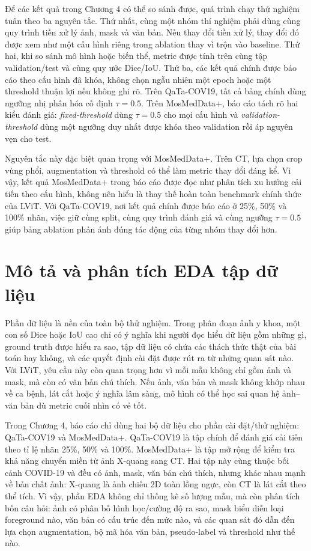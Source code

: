 Để các kết quả trong Chương 4 có thể so sánh được, quá trình chạy thử nghiệm tuân theo ba nguyên tắc. Thứ nhất, cùng một nhóm thí nghiệm phải dùng cùng quy trình tiền xử lý ảnh, mask và văn bản. Nếu thay đổi tiền xử lý, thay đổi đó được xem như một cấu hình riêng trong ablation thay vì trộn vào baseline. Thứ hai, khi so sánh mô hình hoặc biến thể, metric được tính trên cùng tập validation/test và cùng quy ước Dice/IoU. Thứ ba, các kết quả chính được báo cáo theo cấu hình đã khóa, không chọn ngẫu nhiên một epoch hoặc một threshold thuận lợi nếu không ghi rõ. Trên QaTa-COV19, tất cả bảng chính dùng ngưỡng nhị phân hóa cố định \(\tau=0.5\). Trên MosMedData+, báo cáo tách rõ hai kiểu đánh giá: \textit{fixed-threshold} dùng \(\tau=0.5\) cho mọi cấu hình và \textit{validation-threshold} dùng một ngưỡng duy nhất được khóa theo validation rồi áp nguyên vẹn cho test.

Nguyên tắc này đặc biệt quan trọng với MosMedData+. Trên CT, lựa chọn crop vùng phổi, augmentation và threshold có thể làm metric thay đổi đáng kể. Vì vậy, kết quả MosMedData+ trong báo cáo được đọc như phân tích xu hướng cải tiến theo cấu hình, không nên hiểu là thay thế hoàn toàn benchmark chính thức của LViT. Với QaTa-COV19, nơi kết quả chính được báo cáo ở 25\%, 50\% và 100\% nhãn, việc giữ cùng split, cùng quy trình đánh giá và cùng ngưỡng \(\tau=0.5\) giúp bảng ablation phản ánh đúng tác động của từng nhóm thay đổi hơn.

\section{Mô tả và phân tích EDA tập dữ liệu}

Phần dữ liệu là nền của toàn bộ thử nghiệm. Trong phân đoạn ảnh y khoa, một con số Dice hoặc IoU cao chỉ có ý nghĩa khi người đọc hiểu dữ liệu gồm những gì, ground truth được hiểu ra sao, tập dữ liệu có chứa các thách thức thật của bài toán hay không, và các quyết định cài đặt được rút ra từ những quan sát nào. Với LViT, yêu cầu này còn quan trọng hơn vì mỗi mẫu không chỉ gồm ảnh và mask, mà còn có văn bản chú thích. Nếu ảnh, văn bản và mask không khớp nhau về ca bệnh, lát cắt hoặc ý nghĩa lâm sàng, mô hình có thể học sai quan hệ ảnh--văn bản dù metric cuối nhìn có vẻ tốt.

Trong Chương 4, báo cáo chỉ dùng hai bộ dữ liệu cho phần cài đặt/thử nghiệm: QaTa-COV19 và MosMedData+. QaTa-COV19 là tập chính để đánh giá cải tiến theo tỉ lệ nhãn 25\%, 50\% và 100\%. MosMedData+ là tập mở rộng để kiểm tra khả năng chuyển miền từ ảnh X-quang sang CT. Hai tập này cùng thuộc bối cảnh COVID-19 và đều có ảnh, mask, văn bản chú thích, nhưng khác nhau mạnh về bản chất ảnh: X-quang là ảnh chiếu 2D toàn lồng ngực, còn CT là lát cắt theo thể tích. Vì vậy, phần EDA không chỉ thống kê số lượng mẫu, mà còn phân tích bốn câu hỏi: ảnh có phân bố hình học/cường độ ra sao, mask biểu diễn loại foreground nào, văn bản có cấu trúc đến mức nào, và các quan sát đó dẫn đến lựa chọn augmentation, bộ mã hóa văn bản, pseudo-label và threshold như thế nào.

